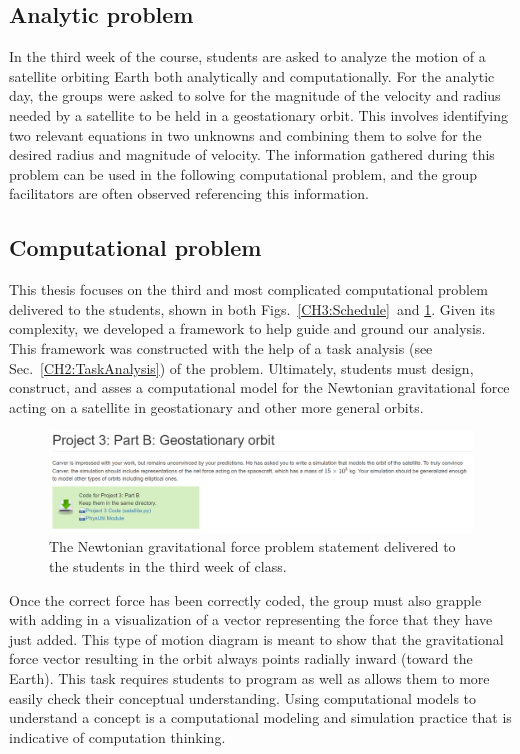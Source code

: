 \documentclass{msuphddissertation}
\begin{document}
\begin{doublespace}
\subsection{Analytic problem}

In the third week of the course, students are asked to analyze the motion of a satellite orbiting Earth both analytically and computationally.  For the analytic day, the groups were asked to solve for the magnitude of the velocity and radius needed by a satellite to be held in a geostationary orbit.  This involves identifying two relevant equations in two unknowns and combining them to solve for the desired radius and magnitude of velocity.  The information gathered during this problem can be used in the following computational problem, and the group facilitators are often observed referencing this information.

\subsection{Computational problem}

This thesis focuses on the third and most complicated computational problem delivered to the students, shown in both Figs.~\ref{CH3:Schedule}\ and \ref{CH3:SatelliteProblem}. Given its complexity, we developed a framework to help guide and ground our analysis.  This framework was constructed with the help of a task analysis (see Sec.~\ref{CH2:TaskAnalysis}) of the problem.  Ultimately, students must design, construct, and asses a computational model for the Newtonian gravitational force acting on a satellite in geostationary and other more general orbits.

\begin{figure}[ht]\centering
\includegraphics[width=\textwidth]{images/CH3SatelliteProblem.pdf}
\caption{The Newtonian gravitational force problem statement delivered to the students in the third week of class.}\label{CH3:SatelliteProblem}
\end{figure}

Once the correct force has been correctly coded, the group must also grapple with adding in a visualization of a vector representing the force that they have just added.  This type of motion diagram is meant to show that the gravitational force vector resulting in the orbit always points radially inward (toward the Earth).  This task requires students to program as well as allows them to more easily check their conceptual understanding.  Using computational models to understand a concept is a computational modeling and simulation practice that is indicative of computation thinking.


\end{doublespace}
\end{document}
